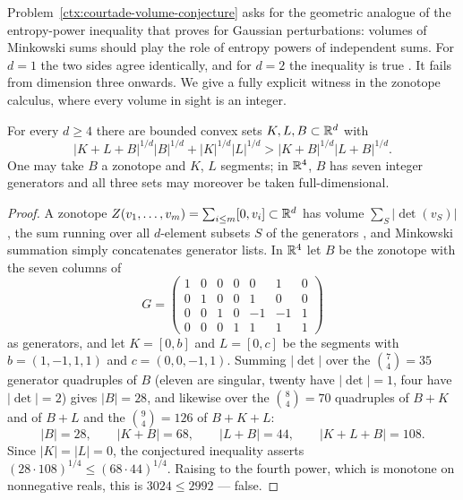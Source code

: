 \begin{cxrefutation}
Problem~\ref{ctx:courtade-volume-conjecture} asks for the geometric analogue
of the entropy-power inequality that \citet{Courtade2017Concavity} proves for
Gaussian perturbations: volumes of Minkowski sums should play the role of
entropy powers of independent sums.  For $d=1$ the two sides agree
identically, and for $d=2$ the inequality is true
\citep{FradeliziMadimanMeyerZvavitch2024}.  It fails from dimension three
onwards.  We give a fully explicit witness in the zonotope calculus, where
every volume in sight is an integer.

\begin{theorem}
\label{thm:courtade-volume-conjecture}
For every $d\ge4$ there are bounded convex sets $K,L,B\subset\mathbb R^d$ with
\[
|K+L+B|^{1/d}|B|^{1/d}+|K|^{1/d}|L|^{1/d}>|K+B|^{1/d}|L+B|^{1/d}.
\]
One may take $B$ a zonotope and $K$, $L$ segments; in $\mathbb R^4$, $B$ has seven
integer generators and all three sets may moreover be taken full-dimensional.
\end{theorem}

\begin{proof}
A zonotope $Z(v_1,\dots,v_m)=\sum_{i\le m}[0,v_i]\subset\mathbb R^d$ has volume
$\sum_S|\det(v_S)|$, the sum running over all $d$-element subsets $S$ of the
generators \citep{Shephard1974}, and Minkowski summation simply concatenates
generator lists.  In $\mathbb R^4$ let $B$ be the zonotope with the seven columns of
\[
G=\begin{pmatrix}
1&0&0&0&0&1&0\\
0&1&0&0&1&0&0\\
0&0&1&0&-1&-1&1\\
0&0&0&1&1&1&1
\end{pmatrix}
\]
as generators, and let $K=[0,b]$ and $L=[0,c]$ be the segments with
$b=(1,-1,1,1)$ and $c=(0,0,-1,1)$.  Summing $|\det|$ over the
$\binom{7}{4}=35$ generator quadruples of $B$ (eleven are singular, twenty
have $|\det|=1$, four have $|\det|=2$) gives $|B|=28$, and likewise over the
$\binom{8}{4}=70$ quadruples of $B+K$ and of $B+L$ and the
$\binom{9}{4}=126$ of $B+K+L$:
\[
|B|=28,\qquad|K+B|=68,\qquad|L+B|=44,\qquad|K+L+B|=108.
\]
Since $|K|=|L|=0$, the conjectured inequality asserts
$(28\cdot108)^{1/4}\le(68\cdot44)^{1/4}$.  Raising to the fourth power, which
is monotone on nonnegative reals, this is $3024\le2992$ --- false.


\end{proof}
\end{cxrefutation}
